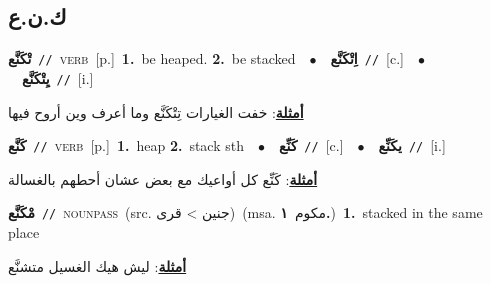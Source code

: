 \documentclass[10pt,a4paper,twoside]{article} %
\begin{document}
\begin{multicols}{2}
\vspace{-3mm}
\subsection*{\color{blue}\foreignlanguage{arabic}{ك.ن.ع}\color{blue}{}} 

{\setlength\topsep{0pt}\textbf{\foreignlanguage{arabic}{تْكَنَّع}}\ {\color{gray}\texttt{//}\color{black}}\ \textsc{verb}\ [p.]\ \textbf{1.}~be heaped.  \textbf{2.}~be stacked\ \ $\bullet$\ \ \setlength\topsep{0pt}\textbf{\foreignlanguage{arabic}{اِتْكَنَّع}}\ {\color{gray}\texttt{//}\color{black}}\ [c.]\ \ $\bullet$\ \ \setlength\topsep{0pt}\textbf{\foreignlanguage{arabic}{يِتْكَنَّع}}\ {\color{gray}\texttt{//}\color{black}}\ [i.]\  \begin{flushright}\color{gray}\foreignlanguage{arabic}{\textbf{\underline{\foreignlanguage{arabic}{أمثلة}}}: خفت الغيارات تِتْكَنَّع وما أعرف وين أروح فيها}\end{flushright}\color{black}} \vspace{2mm}

{\setlength\topsep{0pt}\textbf{\foreignlanguage{arabic}{كَنَّع}}\ {\color{gray}\texttt{//}\color{black}}\ \textsc{verb}\ [p.]\ \textbf{1.}~heap  \textbf{2.}~stack sth\ \ $\bullet$\ \ \setlength\topsep{0pt}\textbf{\foreignlanguage{arabic}{كَنِّع}}\ {\color{gray}\texttt{//}\color{black}}\ [c.]\ \ $\bullet$\ \ \setlength\topsep{0pt}\textbf{\foreignlanguage{arabic}{يكَنِّع}}\ {\color{gray}\texttt{//}\color{black}}\ [i.]\  \begin{flushright}\color{gray}\foreignlanguage{arabic}{\textbf{\underline{\foreignlanguage{arabic}{أمثلة}}}: كَنِّع كل أواعيك مع بعض عشان أحطهم بالغسالة}\end{flushright}\color{black}} \vspace{2mm}

{\setlength\topsep{0pt}\textbf{\foreignlanguage{arabic}{مْكَنَّع}}\ {\color{gray}\texttt{//}\color{black}}\ \textsc{noun\textunderscore pass}\ (src. \color{gray}\foreignlanguage{arabic}{جنين > قرى}\color{black})\ \color{gray}(msa. \foreignlanguage{arabic}{مكوم}~\foreignlanguage{arabic}{\textbf{١.}})\color{black}\ \textbf{1.}~stacked in the same place\  \begin{flushright}\color{gray}\foreignlanguage{arabic}{\textbf{\underline{\foreignlanguage{arabic}{أمثلة}}}: ليش هيك الغسيل متشنَّع}\end{flushright}\color{black}} \vspace{2mm}


\end{multicols}
\end{document}

